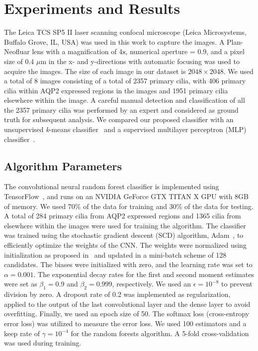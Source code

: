 \section{Experiments and Results}

The Leica TCS SP5 II laser scanning confocal microscope (Leica Microsystems, Buffalo Grove, IL, USA) was used in this work to capture the images. A Plan-Neofluar lens with a magnification of 4$\textsf{x}$, numerical aperture = 0.9, and a pixel size of 0.4 $\mu$m in the x- and y-directions with automatic focusing was used to acquire the images. The size of each image in our dataset is $2048 \times 2048$. We used a total of 8 images consisting of a total of 2357 primary cilia, with 406 primary cilia within AQP2 expressed regions in the images and 1951 primary cilia elsewhere within the image. A careful manual detection and classification of all the 2357 primary cilia was performed by an expert and considered as ground truth for subsequent analysis. We compared our proposed classifier with an unsupervised \emph{k}-means classifier~\cite{dundar_Simplicity_2015} and a supervised multilayer perceptron (MLP) classifier~\cite{haykin_Neural_2009}.

\subsection{Algorithm Parameters}

The convolutional neural random forest classifier is implemented using TensorFlow~\cite{abadi_tensorflowlarge_2016}, and runs on an NVIDIA GeForce GTX TITAN X GPU with 8GB of memory. We used 70\% of the data for training and 30\% of the data for testing. A total of 284 primary cilia from AQP2 expressed regions and 1365 cilia from elsewhere within the images were used for training the algorithm. The classifier was trained using the stochastic gradient descent (SCD) algorithm, Adam~\cite{kingma_Adam_2014}, to efficiently optimize the weights of the CNN\@. The weights were normalized using initialization as proposed in~\cite{gupta_Convolutional_2017} and updated in a mini-batch scheme of 128 candidates. The biases were initialized with zero, and the learning rate was set to $\alpha = 0.001$. The exponential decay rates for the first and second moment estimates were set as $\beta_{1} = 0.9$ and $\beta_{2} = 0.999$, respectively. We used an $\epsilon = 10^{-8}$ to prevent division by zero. A dropout rate of 0.2 was implemented as regularization, applied to the output of the last convolutional layer and the dense layer to avoid overfitting. Finally, we used an epoch size of 50. The softmax loss (cross-entropy error loss) was utilized to measure the error loss. We used 100 estimators and a keep rate of $\gamma = 10^{-4}$ for the random forests algorithm. A 5-fold cross-validation was used during training.%

